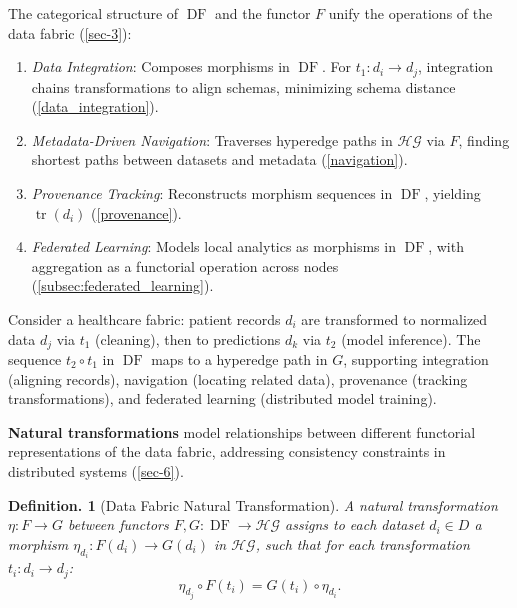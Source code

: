 \documentclass{amsart}
\newtheorem{defn}[thm]{Definition.}
\DeclareMathOperator\DF{DF}
\DeclareMathOperator\tr{tr}
\begin{document}
The categorical structure of \( \DF \) and the functor \( F \) unify the operations of the data fabric (\cref{sec-3}):

\begin{enumerate}
    \item \emph{Data Integration}: Composes morphisms in \( \DF \). For \( t_1: d_i \to d_j \), integration chains transformations to align schemas, minimizing schema distance (\cref{data_integration}).
    \item \emph{Metadata-Driven Navigation}: Traverses hyperedge paths in \( \mathcal{HG} \) via \( F \), finding shortest paths between datasets and metadata (\cref{navigation}).
    \item \emph{Provenance Tracking}: Reconstructs morphism sequences in \( \DF \), yielding \( \tr (d_i) \) (\cref{provenance}).
    \item \emph{Federated Learning}: Models local analytics as morphisms in \( \DF \), with aggregation as a functorial operation across nodes (\cref{subsec:federated_learning}).
\end{enumerate}

Consider a healthcare fabric: patient records \( d_i \) are transformed to normalized data \( d_j \) via \( t_1 \) (cleaning), then to predictions \( d_k \) via \( t_2 \) (model inference). The sequence \( t_2 \circ t_1 \) in \( \DF \) maps to a hyperedge path in \( G \), supporting integration (aligning records), navigation (locating related data), provenance (tracking transformations), and federated learning (distributed model training).


\textbf{Natural transformations} model relationships between different functorial representations of the data fabric, addressing consistency constraints in distributed systems (\cref{sec-6}).

\begin{defn}[Data Fabric Natural Transformation]
\label{subsec:natural_transformations}
A \emph{natural transformation} \( \eta: F \to G \) between functors \( F, G: \DF \to \mathcal{HG} \) assigns to each dataset \( d_i \in D \) a morphism \( \eta_{d_i}: F(d_i) \to G(d_i) \) in \( \mathcal{HG} \), such that for each transformation \( t_i: d_i \to d_j \):
\[
\eta_{d_j} \circ F(t_i) = G(t_i) \circ \eta_{d_i}.
\]
\end{defn}
\end{document}
